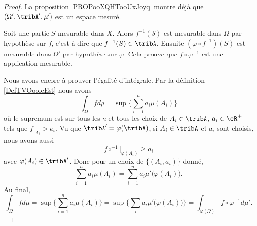 \begin{proof}
    La proposition \ref{PROPooXQHTooUxJoyq} montre déjà que \( (\Omega',\tribA',\mu')\) est un espace mesuré.

    Soit une partie \( S\) mesurable dans \( X\). Alors \( f^{-1}(S)\) est mesurable dans \( \Omega\) par hypothèse sur \( f\), c'est-à-dire que \( f^{-1}(S)\in\tribA\). Ensuite \( (\varphi\circ f^{-1})(S)\) est mesurable dans \( \Omega'\) par hypothèse sur \( \varphi\). Cela prouve que \(  f\circ\varphi^{-1} \) est une application mesurable.

    Nous avons encore à prouver l'égalité d'intégrale. Par la définition \ref{DefTVOooleEst} nous avons
    \begin{equation}
        \int_{\Omega}fd\mu=\sup\{ \sum_{i=1}^na_i\mu(A_i) \}
    \end{equation}
    où le supremum est sur tous les \( n\) et tous les choix de \( A_i\in\tribA\), \( a_i\in\eR^+\) tels que \( f|_{A_i}>a_i\). Vu que \( \tribA'=\varphi(\tribA)\), si \( A_i\in \tribA\) et \( a_i\) sont choisis, nous avons aussi 
    \begin{equation}
        f\circ^{-1}|_{\varphi(A_i)}\geq a_i
    \end{equation}
    avec \( \varphi(A_i)\in\tribA'\). Donc pour un choix de \( \{ (A_i,a_i) \}\) donné,
    \begin{equation}
        \sum_{i=1}^na_i\mu(A_i)=\sum_{i=1}^na_i\mu'\big( \varphi(A_i) \big).
    \end{equation}
    Au final,
    \begin{equation}
        \int_{\Omega}fd\mu=\sup\{ \sum_{i=1}^na_i\mu(A_i) \}=\sup\{ \sum_ia_i\mu'\big( \varphi(A_i) \big) \}=\int_{\varphi(\Omega)}f\circ\varphi^{-1}d\mu'.
    \end{equation}
\end{proof}

